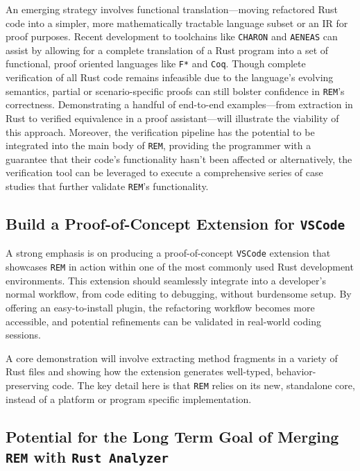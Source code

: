 An emerging strategy involves functional translation---moving refactored Rust
code into a simpler, more mathematically tractable language subset or an IR for
proof purposes. Recent development to toolchains like
\texttt{CHARON}\cite{charon} and \texttt{AENEAS}\cite{aeneas} can assist by
allowing for a complete translation of a Rust program into a set of functional,
proof oriented languages like \texttt{F*} and \texttt{Coq}. Though complete
verification of all Rust code remains infeasible due to the language's evolving
semantics, partial or scenario-specific proofs can still bolster confidence in
\texttt{REM}'s correctness. Demonstrating a handful of end-to-end
examples---from extraction in Rust to verified equivalence in a proof
assistant---will illustrate the viability of this approach. Moreover, the
verification pipeline has the potential to be integrated into the main body of
\texttt{REM}, providing the programmer with a guarantee that their code's
functionality hasn't been affected or alternatively, the verification tool can
be leveraged to execute a comprehensive series of case studies that further
validate \texttt{REM}'s functionality.

\subsection{Build a Proof-of-Concept Extension for \texttt{VSCode}}
\label{sec:vscode-extension}

A strong emphasis is on producing a proof-of-concept \texttt{VSCode} extension
that showcases \texttt{REM} in action within one of the most commonly used Rust
development environments. This extension should seamlessly integrate into a
developer's normal workflow, from code editing to debugging, without burdensome
setup. By offering an easy-to-install plugin, the refactoring workflow becomes
more accessible, and potential refinements can be validated in real-world coding
sessions.

A core demonstration will involve extracting method fragments in a variety of
Rust files and showing how the extension generates well-typed,
behavior-preserving code. The key detail here is that \texttt{REM} relies on its
new, standalone core, instead of a platform or program specific implementation.

\subsection{Potential for the Long Term Goal of Merging \texttt{REM} with
\texttt{Rust Analyzer}}
\label{sec:long-term-goal}

